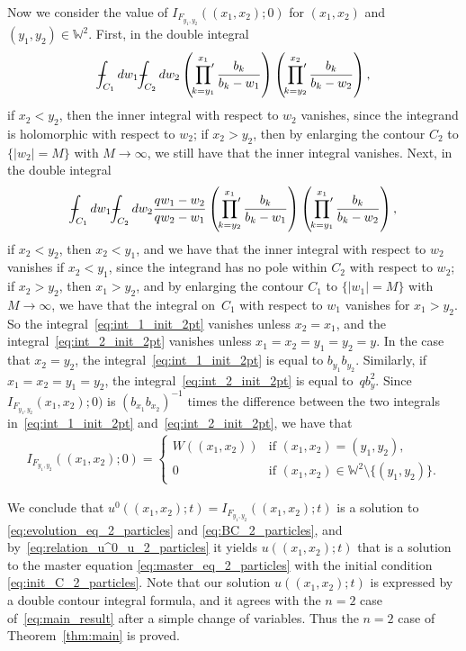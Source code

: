 \documentclass[11pt]{article}
\numberwithin{equation}{section}
\def\Xint#1{\mathchoice
{\XXint\displaystyle\textstyle{#1}}%
{\XXint\textstyle\scriptstyle{#1}}%
{\XXint\scriptstyle\scriptscriptstyle{#1}}%
{\XXint\scriptscriptstyle\scriptscriptstyle{#1}}%
\!\int}
\def\XXint#1#2#3{{\setbox0=\hbox{$#1{#2#3}{\int}$}
\vcenter{\hbox{$#2#3$}}\kern-.5\wd0}}
\def\dashint{\Xint-}
\newcommand{\prodprime}{\sideset{}{'}\prod}
\newcommand{\Weylchamber}{\mathbb{W}}
\begin{document}
Now we consider the value of $I_{F_{y_1, y_2}}((x_1, x_2); 0)$ for $(x_1, x_2)$ and $(y_1, y_2) \in \Weylchamber^2$. First, in the double integral
\begin{gather} \label{eq:int_1_init_2pt}
 \dashint_{C_1} dw_1 \dashint_{C_2} dw_2 \left( \prodprime^{x_1}_{k = y_1} \frac{b_k}{b_k - w_1} \right) \left( \prodprime^{x_2}_{k = y_2} \frac{b_k}{b_k - w_2} \right),
\end{gather}
if $x_2 < y_2$, then the inner integral with respect to $w_2$ vanishes, since the integrand is holomorphic with respect to $w_2$; if $x_2 > y_2$, then by enlarging the contour $C_2$ to $\{ \lvert w_2 \rvert = M \}$ with $M \to \infty$, we still have that the inner integral vanishes. Next, in the double integral
\begin{gather} \label{eq:int_2_init_2pt}
 \dashint_{C_1} dw_1 \dashint_{C_2} dw_2 \frac{qw_1 - w_2}{qw_2 - w_1} \left( \prodprime^{x_1}_{k = y_2} \frac{b_k}{b_k - w_1} \right) \left( \prodprime^{x_1}_{k = y_1} \frac{b_k}{b_k - w_2} \right),
\end{gather}
if $x_2 < y_2$, then $x_2 < y_1$, and we have that the inner integral with respect to $w_2$ vanishes if $x_2 < y_1$, since the integrand has no pole within $C_2$ with respect to $w_2$; if $x_2 > y_2$, then $x_1 > y_2$, and by enlarging the contour $C_1$ to $\{ \lvert w_1 \rvert = M \}$ with $M \to \infty$, we have that the integral on~$C_1$ with respect to $w_1$ vanishes for $x_1 > y_2$. So the integral~\eqref{eq:int_1_init_2pt} vanishes unless $x_2 = x_1$, and the integral~\eqref{eq:int_2_init_2pt} vanishes unless $x_1 = x_2 = y_1 = y_2 = y$. In the case that $x_2 = y_2$, the integral~\eqref{eq:int_1_init_2pt} is equal to $b_{y_1} b_{y_2}$. Similarly, if $x_1 = x_2 = y_1 = y_2$, the integral~\eqref{eq:int_2_init_2pt} is equal to~$q b^2_y$. Since $I_{F_{y_1, y_2}}(x_1, x_2); 0)$ is $(b_{x_1} b_{x_2})^{-1}$ times the dif\/ference between the two integrals in~\eqref{eq:int_1_init_2pt} and~\eqref{eq:int_2_init_2pt}, we have that
\begin{gather*}
 I_{F_{y_1, y_2}}((x_1, x_2); 0) =
 \begin{cases}
 W((x_1, x_2)) & \text{if $(x_1, x_2) = (y_1, y_2)$}, \\
 0 & \text{if $(x_1, x_2) \in \Weylchamber^2 {\setminus} \{ (y_1, y_2) \}$}.
 \end{cases}
\end{gather*}

We conclude that $u^0((x_1, x_2); t) = I_{F_{y_1, y_2}}((x_1, x_2); t)$ is a solution to \eqref{eq:evolution_eq_2_particles} and \eqref{eq:BC_2_particles}, and by~\eqref{eq:relation_u^0_u_2_particles} it yields $u((x_1, x_2); t)$ that is a solution to the master equation \eqref{eq:master_eq_2_particles} with the initial condition \eqref{eq:init_C_2_particles}. Note that our solution $u((x_1, x_2); t)$ is expressed by a double contour integral formula, and it agrees with the $n = 2$ case of~\eqref{eq:main_result} after a simple change of variables. Thus the $n = 2$ case of Theorem~\ref{thm:main} is proved.
\end{document}
